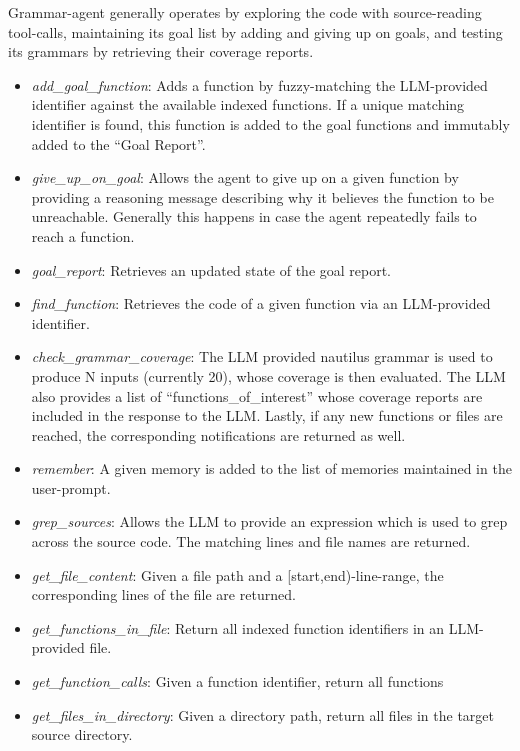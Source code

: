         Grammar-agent generally operates by exploring the code with source-reading tool-calls, maintaining its goal list by adding and giving up on goals, and testing its grammars by retrieving their coverage reports.

        \begin{itemize}
            \item \textit{add\_goal\_function}: Adds a function by fuzzy-matching the LLM-provided identifier against the available indexed functions. If a unique matching identifier is found, this function is added to the goal functions and immutably added to the ``Goal Report''.
            \item \textit{give\_up\_on\_goal}: Allows the agent to give up on a given function by providing a reasoning message describing why it believes the function to be unreachable. Generally this happens in case the agent repeatedly fails to reach a function.
            \item \textit{goal\_report}: Retrieves an updated state of the goal report.
            \item \textit{find\_function}: Retrieves the code of a given function via an LLM-provided identifier.
            \item \textit{check\_grammar\_coverage}: The LLM provided nautilus grammar is used to produce N inputs (currently 20), whose coverage is then evaluated. The LLM also provides a list of ``functions\_of\_interest'' whose coverage reports are included in the response to the LLM. Lastly, if any new functions or files are reached, the corresponding notifications are returned as well.
            \item \textit{remember}: A given memory is added to the list of memories maintained in the user-prompt.
            \item \textit{grep\_sources}: Allows the LLM to provide an expression which is used to grep across the source code. The matching lines and file names are returned.
            \item \textit{get\_file\_content}: Given a file path and a [start,end)-line-range, the corresponding lines of the file are returned.
            \item \textit{get\_functions\_in\_file}: Return all indexed function identifiers in an LLM-provided file.
            \item \textit{get\_function\_calls}: Given a function identifier, return all functions
            \item \textit{get\_files\_in\_directory}: Given a directory path, return all files in the target source directory.
        \end{itemize}

